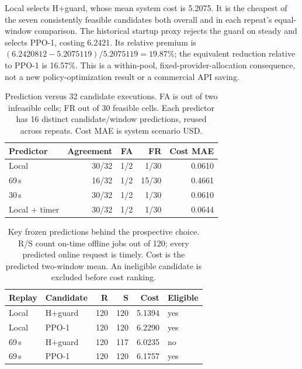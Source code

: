 Local selects H+guard, whose mean system cost is 5.2075. It is the cheapest
of the seven consistently feasible candidates both overall and in each
repeat's equal-window comparison. The historical startup proxy rejects the
guard on steady and selects PPO-1, costing 6.2421. Its relative premium is
$(6.2420812-5.2075119)/5.2075119=19.87\%$; the equivalent reduction relative
to PPO-1 is 16.57\%. This is a within-pool, fixed-provider-allocation consequence,
not a new policy-optimization result or a commercial API saving.

\begin{table}[t]
\centering\small
\caption{Prediction versus 32 candidate executions. FA is out of two
infeasible cells; FR out of 30 feasible cells. Each predictor has 16 distinct
candidate/window predictions, reused across repeats. Cost MAE is system scenario USD.}
\label{tab:realapi-predictions}
\setlength{\tabcolsep}{3pt}
\begin{tabular*}{\linewidth}{@{\extracolsep{\fill}}lrrrr@{}}
\toprule
Predictor & Agreement & FA & FR & Cost MAE\\
\midrule
Local & 30/32 & 1/2 & 1/30 & 0.0610\\
69\,s & 16/32 & 1/2 & 15/30 & 0.4661\\
30\,s & 30/32 & 1/2 & 1/30 & 0.0610\\
Local + timer & 30/32 & 1/2 & 1/30 & 0.0644\\
\bottomrule
\end{tabular*}
\end{table}

\begin{table}[t]
\centering\small
\caption{Key frozen predictions behind the prospective choice. R/S count
on-time offline jobs out of 120; every predicted online request is timely.
Cost is the predicted two-window mean. An ineligible candidate is excluded
before cost ranking.}
\label{tab:realapi-eligibility}
\setlength{\tabcolsep}{3pt}
\begin{tabular*}{\linewidth}{@{\extracolsep{\fill}}llrrrl@{}}
\toprule
Replay & Candidate & R & S & Cost & Eligible\\
\midrule
Local & H+guard & 120 & 120 & 5.1394 & yes\\
Local & PPO-1 & 120 & 120 & 6.2290 & yes\\
69\,s & H+guard & 120 & 117 & 6.0235 & no\\
69\,s & PPO-1 & 120 & 120 & 6.1757 & yes\\
\bottomrule
\end{tabular*}
\end{table}

